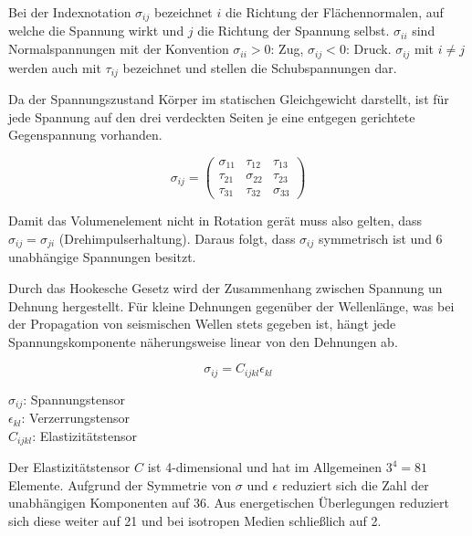\documentclass[pdftex,a4paper,parskip,listof=totoc,bibliography=totoc,onehalfspacing,12pt]{scrreprt}
\begin{document}
Bei der Indexnotation $\sigma_{ij}$ bezeichnet $i$ die Richtung der Flächennormalen, auf welche die Spannung wirkt und $j$ die Richtung der Spannung selbst. $\sigma_{ii}$ sind Normalspannungen mit der Konvention $\sigma_{ii} > 0$: Zug, $\sigma_{ij} < 0$: Druck. $\sigma_{ij}$ mit $i \neq j$ werden auch mit $\tau_{ij}$ bezeichnet und stellen die Schubspannungen dar.

Da der Spannungszustand Körper im statischen Gleichgewicht darstellt, ist für jede Spannung auf den drei verdeckten Seiten je eine entgegen gerichtete Gegenspannung vorhanden.

\begin{minipage}[t]{0.4\textwidth}
\begin{equation}
	\sigma_{ij}=\left(
\begin{array}{ccc}
\sigma_{11} & \tau_{12} & \tau_{13}\\
\tau_{21} & \sigma_{22} & \tau_{23}\\
\tau_{31} & \tau_{32} & \sigma_{33}
\end{array}
\right)
\end{equation}
\end{minipage}
\hfill
\begin{minipage}[t]{0.45\textwidth}
Damit das Volumenelement nicht in Rotation gerät muss also gelten, dass $\sigma_{ij} = \sigma_{ji}$ (Drehimpulserhaltung). Daraus folgt, dass $\sigma_{ij}$ symmetrisch ist und \num{6} unabhängige Spannungen besitzt.
\end{minipage}

Durch das Hookesche Gesetz wird der Zusammenhang zwischen Spannung un Dehnung hergestellt. Für kleine Dehnungen gegenüber der Wellenlänge, was bei der Propagation von seismischen Wellen stets gegeben ist, hängt jede Spannungskomponente näherungsweise linear von den Dehnungen ab.

\begin{minipage}[t]{0.4\textwidth}
\begin{equation}
	\sigma_{ij} = C_{ijkl} \epsilon_{kl}
\end{equation}
\end{minipage}
\hfill
\begin{minipage}[t]{0.45\textwidth}
$\sigma_{ij}$: Spannungstensor\\
$\epsilon_{kl}$: Verzerrungstensor\\
$C_{ijkl}$: Elastizitätstensor
\end{minipage}

Der Elastizitätstensor $C$ ist \num{4}-dimensional und hat im Allgemeinen $3^4 = 81$ Elemente. Aufgrund der Symmetrie von $\sigma$ und $\epsilon$ reduziert sich die Zahl der unabhängigen Komponenten auf 36. Aus energetischen Überlegungen reduziert sich diese weiter auf \num{21} und bei isotropen Medien schließlich auf \num{2}.
\end{document}
